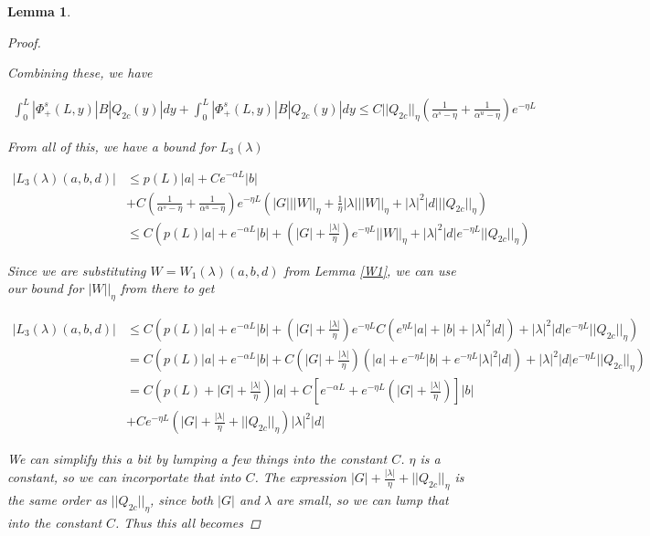 \documentclass[12pt]{article}
\newtheorem{lemma}{Lemma}
\begin{document}
\begin{lemma}
\begin{proof}
\begin{enumerate}
Combining these, we have

\begin{align*}
\int_0^L |\Phi^s_+(L, y)| B |Q_{2c}(y)| dy + \int_0^L |\Phi^s_+(L, y)| B |Q_{2c}(y)| dy \leq
C ||Q_{2c}||_\eta \left( \frac{1}{\alpha^s - \eta} + \frac{1}{\alpha^u - \eta} \right) e^{-\eta L}
\end{align*}

\end{enumerate}

From all of this, we have a bound for $L_3(\lambda)$

\begin{align*}
|L_3(\lambda)(a,b,d)| &\leq p(L)|a| + C e^{-\alpha L}|b| \\
&+  C \left( \frac{1}{\alpha^s - \eta} + \frac{1}{\alpha^u - \eta} \right) e^{-\eta L} 
\left( |G| ||W||_\eta + \frac{1}{\eta} |\lambda| ||W||_\eta + |\lambda|^2 |d| ||Q_{2c}||_\eta \right)\\
&\leq C\left( p(L)|a| + e^{-\alpha L}|b| + \left(|G| + \frac{|\lambda|}{\eta}\right)e^{-\eta L}||W||_\eta + |\lambda|^2 |d| e^{-\eta L} ||Q_{2c}||_\eta \right)
\end{align*}

Since we are substituting $W = W_1(\lambda)(a,b,d)$ from Lemma \ref{W1}, we can use our bound for $|W||_\eta$ from there to get

\begin{align*}
|L_3(\lambda)(a,b,d)| 
&\leq C\left( p(L)|a| + e^{-\alpha L}|b| + \left(|G| + \frac{|\lambda|}{\eta}\right)e^{-\eta L}C(e^{\eta L}|a| + |b| + |\lambda|^2 |d|) + |\lambda|^2 |d| e^{-\eta L} ||Q_{2c}||_\eta \right) \\
&= C\left( p(L)|a| + e^{-\alpha L}|b| + C \left(|G| + \frac{|\lambda|}{\eta}\right)(|a| + e^{-\eta L}|b| + e^{-\eta L}|\lambda|^2 |d|) + |\lambda|^2 |d| e^{-\eta L} ||Q_{2c}||_\eta \right) \\
&= C \left( p(L) + |G| + \frac{|\lambda|}{\eta}\right)|a| + C \left[ e^{-\alpha L} + e^{-\eta L} \left(|G| + \frac{|\lambda|}{\eta}\right) \right] |b|  \\
&+ C e^{-\eta L} \left( |G| + \frac{|\lambda|}{\eta} + ||Q_{2c}||_\eta \right)|\lambda|^2 |d|
\end{align*}

We can simplify this a bit by lumping a few things into the constant $C$. $\eta$ is a constant, so we can incorportate that into $C$. The expression $|G| + \frac{|\lambda|}{\eta} + ||Q_{2c}||_\eta$ is the same order as $||Q_{2c}||_\eta$, since both $|G|$ and $\lambda$ are small, so we can lump that into the constant $C$. Thus this all becomes


\end{proof}
\end{lemma}
\end{document}
